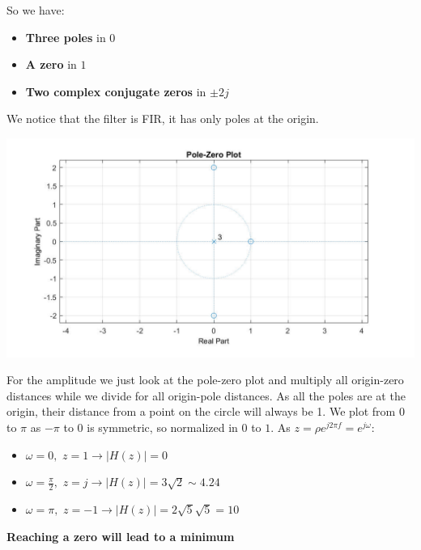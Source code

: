 {        \vspace{1em}
        So we have:
        \begin{itemize}
            \item \textbf{Three poles} in $0$
            \item \textbf{A zero} in $1$
            \item \textbf{Two complex conjugate zeros} in $\pm 2j$
        \end{itemize}
        We notice that the filter is FIR, it has only poles at the origin.
        \begin{center}
            \includegraphics[width=1\textwidth]{images/20220217_01.png}
        \end{center}
        For the amplitude we just look at the pole-zero plot and multiply all origin-zero distances while we divide for all origin-pole distances. As all the poles are at the origin, their distance from a point on the circle will always be 1. We plot from 0 to $\pi$ as $-\pi$ to $0$ is symmetric, so normalized in $0$ to $1$. As $z=\rho e^{j2\pi f}=e^{j\omega}$:
        \begin{itemize}
            \item $\omega=0,\,\,z=1\rightarrow|H(z)|=0$
            \item $\omega=\frac{\pi}{2},\,\,z=j\rightarrow|H(z)|=3\sqrt{2}\sim 4.24$
            \item $\omega=\pi,\,\,z=-1\rightarrow|H(z)|=2\sqrt{5}\sqrt{5}=10$
        \end{itemize}
        \textbf{Reaching a zero will lead to a minimum}
    }

